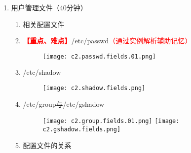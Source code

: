 \documentclass{TIJMUjiaoanLL}
\begin{document}
\begin{enumerate}
  \item 用户管理文件（40分钟）
    \begin{enumerate}
      \item 相关配置文件
	\item \textcolor{red}{\textbf{【重点、难点】}}/etc/passwd\textcolor{red}{（通过实例解析辅助记忆）}
	\vspace*{-10pt}
	\begin{figure}[h]
	  \centering
	  \texttt{[image: c2.passwd.fields.01.png]}
	\end{figure}

      \item /etc/shadow
	\vspace*{-10pt}
	\begin{figure}[h]
	  \centering
	  \texttt{[image: c2.shadow.fields.png]}
	\end{figure}

	\vspace*{-25pt}
      \item /etc/group与/etc/gshadow
	\vspace*{-10pt}
	\begin{figure}[h]
	  \centering
	  \texttt{[image: c2.group.fields.01.png]}
	  \quad
	  \texttt{[image: c2.gshadow.fields.png]}
	\end{figure}

\otherTail
\newpage
\otherHeader

      \item 配置文件的关系
    \end{enumerate}


\end{enumerate}
\end{document}
